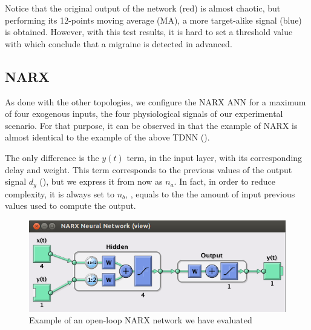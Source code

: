 Notice that the original output of the network (red) is almost chaotic, but performing its 12-points moving average (MA), a more target-alike signal (blue) is obtained. However, with this test results, it is hard to set a threshold value with which conclude that a migraine is detected in advanced.



\subsection{NARX}
\label{subsec:narxapplication}

As done with the other topologies, we configure the NARX ANN for a maximum of four exogenous inputs, the four physiological signals of our experimental scenario. 
For that purpose, it can be observed in  that the example of NARX is almost identical to the example of the above TDNN (). 

The only difference is the $y(t)$ term, in the input layer, with its corresponding delay and weight. This term corresponds to the previous values of the output signal $d_{y}$ (), but we express it from now as $n_{a}$.  In fact, in order to reduce complexity, it is always set to $n_{b}$, \ie, equals to the the amount of input previous values used to compute the output.


\begin{figure}[!ht]
\centering
\includegraphics[width=0.9\columnwidth]{images/results/narxOpenloop}
\caption{Example of an open-loop NARX network we have evaluated}
\label{fig:narxopenloop}
\end{figure}

